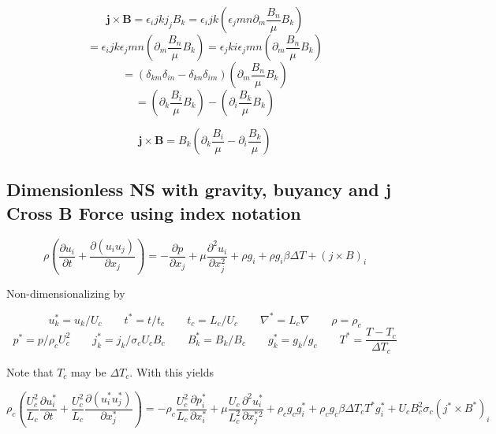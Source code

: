 \documentclass[11pt]{article}
\begin{document}
\begin{equation}
	\pmb{j}\times \pmb{B} = \epsilon_ijk j_j B_k = 
	\epsilon_ijk \left( \epsilon_jmn \partial_m \frac{B_n}{\mu} B_k \right)
\end{equation}
\begin{equation}
	= \epsilon_ijk \epsilon_jmn \left( \partial_m \frac{B_n}{\mu} B_k \right)
	= \epsilon_jki \epsilon_jmn \left( \partial_m \frac{B_n}{\mu} B_k \right)
\end{equation}
\begin{equation}
	= (\delta_{km} \delta_{in} - \delta_{kn} \delta_{im} ) \left( \partial_m \frac{B_n}{\mu} B_k \right)
\end{equation}
\begin{equation}
	= \left( \partial_k \frac{B_i}{\mu} B_k \right) - 
	\left( \partial_i \frac{B_k}{\mu} B_k \right)
\end{equation}

\begin{equation}
	\pmb{j} \times \pmb{B} = B_k 
	\left( \partial_k \frac{B_i}{\mu} - \partial_i \frac{B_k}{\mu} \right)
\end{equation}

\subsection{Dimensionless NS with gravity, buyancy and j Cross B Force using index notation}
\begin{equation}
	\rho 
	\left( 
	\frac{\partial u_i}{\partial t} + 
	\frac{\partial (u_i u_j)}{\partial x_j}
	\right) 
	= 
	- \frac{\partial p}{\partial x_j}
	+ \mu \frac{\partial^2 u_i}{\partial x_j^2}
	+ \rho g_i
	+ \rho g_i \beta \Delta T
	+ (j \times B)_i
\end{equation}

Non-dimensionalizing by

\begin{equation}
	u_k^* = u_k/U_c \qquad
	t^* = t/t_c \qquad
	t_c = L_c/U_c \qquad
	\nabla^* = L_c \nabla \qquad
	\rho = \rho_c
\end{equation}
\begin{equation}
	p^* = p/\rho_c U_c^2 \qquad
	j_k^* = j_k/ \sigma_c U_c B_c \qquad
	B_k^* = B_k/B_c \qquad
	g_k^* = g_k/g_c \qquad
	T^* = \frac{T - T_c}{\Delta T_c}
\end{equation}

Note that $T_c$ may be $\Delta T_c$. With this yields

\begin{equation}
	\rho_c 
	\left( 
	\frac{U_c^2}{L_c} 
	\frac{\partial u_i^*}{\partial t} + 
	\frac{U_c^2}{L_c} 
	\frac{\partial (u_i^* u_j^*)}{\partial x_j^*}
	\right) 
	= 
	- \rho_c \frac{U_c^2}{L_c} 
	\frac{\partial p_i^*}{\partial x_i^*}
	+ \mu \frac{U_c}{L_c^2} 
	\frac{\partial^2 u_i^*}{\partial x_j^*^2}
	+ \rho_c g_c g_i^* 
	+ \rho_c g_c \beta \Delta T_c T^*g_i^*
	+ U_c B_c^2 \sigma_c 
	(j^* \times B^*)_i
\end{equation}
\end{document}
